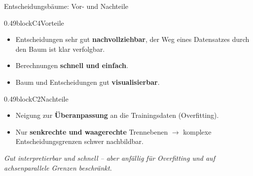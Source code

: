 \begin{frame}{Entscheidungsbäume: Vor- und Nachteile}
\begin{blockrow}
\begin{blockcol}{0.49\textwidth}{blockC4}{Vorteile}
\begin{itemize}
  \item Entscheidungen sehr gut \textbf{nachvollziehbar},  der Weg eines
        Datensatzes durch den Baum ist klar verfolgbar.
  \item Berechnungen \textbf{schnell und einfach}.
  \item Baum und Entscheidungen gut \textbf{visualisierbar}.
\end{itemize}
\end{blockcol}

\begin{blockcol}{0.49\textwidth}{blockC2}{Nachteile}
\begin{itemize}
  \item Neigung zur \textbf{Überanpassung} an die Trainingsdaten
        (Overfitting).
  \item Nur \textbf{senkrechte und waagerechte} Trennebenen $\rightarrow$ komplexe
        Entscheidungsgrenzen schwer nachbildbar.
\end{itemize}
\end{blockcol}
\end{blockrow}

\vspace{0.8em}
\centering
{\footnotesize\itshape Gut interpretierbar und schnell -- aber anfällig für
Overfitting und auf achsenparallele Grenzen beschränkt.}
\end{frame}

\makequizpage{\QUIZURL}{\QUIZQRCODE}{\QUIZIMAGE}
\makequestionspage{\FRAGENIMAGE}


